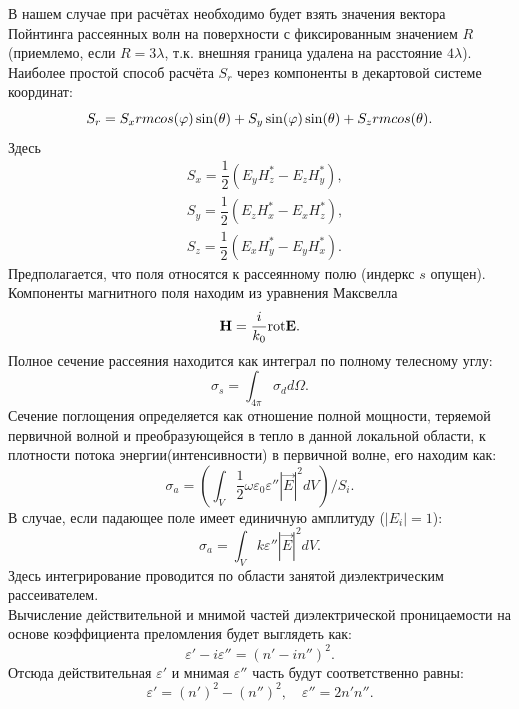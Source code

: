В нашем случае при расчётах необходимо будет взять значения вектора Пойнтинга рассеянных волн на поверхности с фиксированным значением $R$ (приемлемо, если $R=3\lambda$, т.к. внешняя граница удалена на расстояние $4\lambda$).\\
Наиболее простой способ расчёта $S_r$ через компоненты в декартовой системе координат:
\begin{equation}
{S}_r = S_x \\rm cos(\varphi)\sin(\theta) + S_y \sin(\varphi)\sin(\theta) + S_z \\rm cos(\theta).
\end{equation}
Здесь
\begin{eqnarray}
& S_x = \dfrac{1}{2} \left(E_y H_z^* - E_z H_y^*\right),\nonumber\\
& S_y = \dfrac{1}{2} \left(E_z H_x^* - E_x H_z^*\right),\nonumber\\ & S_z = \dfrac{1}{2} \left(E_x H_y^* - E_y H_x^*\right).
\end{eqnarray}
Предполагается, что поля относятся к рассеянному полю (индеркс $s$ опущен).
Компоненты магнитного поля находим из уравнения Максвелла
\begin{equation}
{\vec H} = \dfrac{i}{k_0} {\rm \rm rot} \vec{E}.
\end{equation}
Полное сечение рассеяния находится как интеграл по полному телесному углу:
\begin{equation}
\sigma_s = \int_{4\pi} \sigma_d d\Omega.
\end{equation}
Сечение поглощения определяется как отношение полной мощности, теряемой первичной волной и преобразующейся в тепло в данной локальной области, к плотности потока энергии(интенсивности) в первичной волне, его находим как:
\begin{equation}
\sigma_a = \left(\int_V \dfrac{1}{2}\omega\varepsilon_0\varepsilon''|{\vec E}|^2 d V\right)/S_i.
\end{equation}
В случае, если падающее поле имеет единичную амплитуду ($|E_i|=1$):
\begin{equation}
\sigma_a = \int_V k \varepsilon''|{\vec E}|^2 d V.
\end{equation}
Здесь интегрирование проводится по области занятой диэлектрическим рассеивателем.\\
Вычисление действительной и мнимой частей диэлектрической проницаемости на основе коэффициента преломления будет выглядеть как:
\begin{equation}
\varepsilon' - i \varepsilon'' = (n'-i n'')^2.
\end{equation}
Отсюда действительная $ \varepsilon' $ и мнимая $ \varepsilon'' $ часть будут соответственно равны:
\begin{equation}
\varepsilon' = (n')^2 - (n'')^2,\quad \varepsilon'' = 2 n'n''.
\end{equation}

